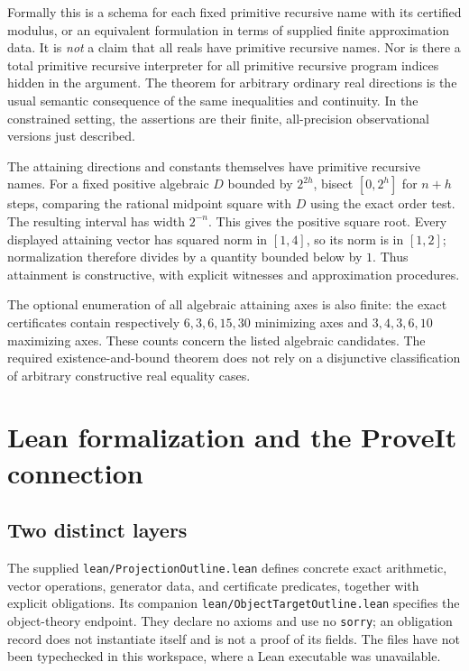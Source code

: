 \documentclass[11pt,a4paper]{article}
\newcommand{\code}[1]{\texttt{#1}}
\begin{document}
Formally this is a schema for each fixed primitive recursive name with its certified modulus, or an equivalent formulation in terms of supplied finite approximation data. It is \emph{not} a claim that all reals have primitive recursive names. Nor is there a total primitive recursive interpreter for all primitive recursive program indices hidden in the argument. The theorem for arbitrary ordinary real directions is the usual semantic consequence of the same inequalities and continuity. In the constrained setting, the assertions are their finite, all-precision observational versions just described.

The attaining directions and constants themselves have primitive recursive names. For a fixed positive algebraic $D$ bounded by $2^{2h}$, bisect $[0,2^h]$ for $n+h$ steps, comparing the rational midpoint square with $D$ using the exact order test. The resulting interval has width $2^{-n}$. This gives the positive square root. Every displayed attaining vector has squared norm in $[1,4]$, so its norm is in $[1,2]$; normalization therefore divides by a quantity bounded below by $1$. Thus attainment is constructive, with explicit witnesses and approximation procedures.

The optional enumeration of all algebraic attaining axes is also finite: the exact certificates contain respectively $6,3,6,15,30$ minimizing axes and $3,4,3,6,10$ maximizing axes. These counts concern the listed algebraic candidates. The required existence-and-bound theorem does not rely on a disjunctive classification of arbitrary constructive real equality cases.

\section{Lean formalization and the ProveIt connection}\label{sec:lean}

\subsection{Two distinct layers}
The supplied \code{lean/ProjectionOutline.lean} defines concrete exact arithmetic, vector operations, generator data, and certificate predicates, together with explicit obligations. Its companion \code{lean/ObjectTargetOutline.lean} specifies the object-theory endpoint. They declare no axioms and use no \code{sorry}; an obligation record does not instantiate itself and is not a proof of its fields. The files have not been typechecked in this workspace, where a Lean executable was unavailable.
\end{document}
